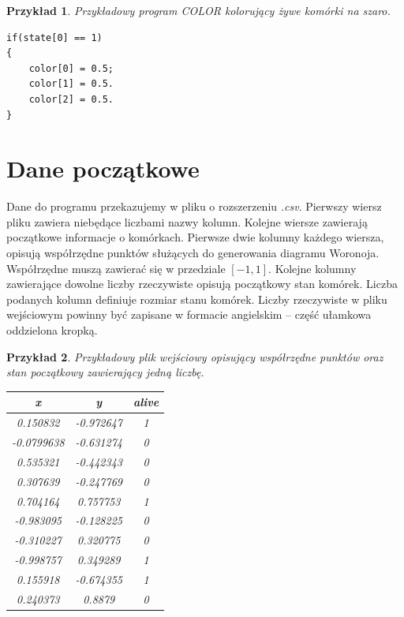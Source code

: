 \documentclass[declaration,shortabstract, inz]{iithesis}
\theoremstyle{definition} \newtheorem{definition}{Definicja}[]
\theoremstyle{plain} \newtheorem{remark}[definition]{Obserwacja}
\theoremstyle{plain} \newtheorem{theorem}[definition]{Twierdzenie}
\theoremstyle{plain} \newtheorem{example}{Przykład}[definition]
\theoremstyle{plain} \newtheorem{lemma}[definition]{Lemat}
\begin{document}
\begin{example}
Przykładowy program \textit{COLOR} kolorujący żywe komórki na szaro.
\begin{center}
\begin{lstlisting}
if(state[0] == 1)
{
	color[0] = 0.5;
	color[1] = 0.5.
	color[2] = 0.5.
}
\end{lstlisting}
\end{center}
\end{example}

\section{Dane początkowe}
Dane do programu przekazujemy w pliku o rozszerzeniu \textit{.csv}. Pierwszy wiersz pliku zawiera niebędące liczbami nazwy kolumn. Kolejne wiersze zawierają początkowe informacje o komórkach. Pierwsze dwie kolumny każdego wiersza, opisują współrzędne punktów służących do generowania diagramu Woronoja.  Współrzędne muszą zawierać się w przedziale $[-1, 1]$. Kolejne kolumny zawierające dowolne liczby rzeczywiste opisują początkowy stan komórek. Liczba podanych kolumn definiuje rozmiar stanu komórek. Liczby rzeczywiste w pliku wejściowym powinny być zapisane w formacie angielskim -- część ułamkowa oddzielona kropką.

\begin{example}
Przykładowy plik wejściowy opisujący współrzędne punktów oraz stan początkowy zawierający jedną liczbę.
\begin{center}
\begin{tabular}{ |c|c|c| } 
 \hline
 x & y & alive \\
  \hline 
 0.150832 & -0.972647 & 1 \\ 
  \hline
 -0.0799638 & -0.631274 & 0 \\
 \hline
  0.535321 & -0.442343 & 0 \\
 \hline
  0.307639 & -0.247769 & 0 \\
 \hline
  0.704164 & 0.757753 & 1 \\
 \hline
 -0.983095 & -0.128225 & 0 \\
 \hline
 -0.310227 & 0.320775 & 0 \\
 \hline
  -0.998757 & 0.349289 & 1 \\
 \hline
  0.155918 & -0.674355 & 1 \\
 \hline
   0.240373 & 0.8879 & 0 \\
 \hline
\end{tabular}
\end{center}
\end{example}
\end{document}
